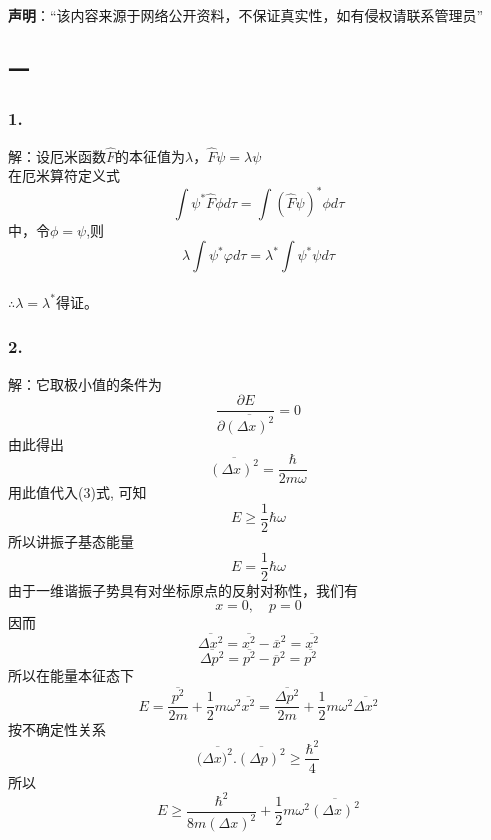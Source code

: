 
\textbf{声明}：“该内容来源于网络公开资料，不保证真实性，如有侵权请联系管理员”

\subsection{一}
\subsubsection{1.}
解：设厄米函数$\hat{F}$的本征值为$\lambda$，$\hat{F}\psi = \lambda \psi$\\
在厄米算符定义式$$\int \psi^* \hat{F} \phi d\tau = \int (\hat{F} \psi)^* \phi d\tau~$$中，令$\phi=\psi$,则$$\lambda \int \psi^* \varphi d\tau = \lambda^* \int \psi^* \psi d\tau~$$\\
$\therefore \lambda=\lambda^*$得证。
\subsubsection{2.}
解：它取极小值的条件为
$$\frac{\partial E}{\partial \overline{(\Delta x)^2}} = 0~$$
由此得出
$$\overline{(\Delta x)^2} = \frac{\hbar}{2 m \omega}~$$
用此值代入(3)式, 可知
$$E \geq \frac{1}{2} \hbar \omega~$$
所以讲振子基态能量
$$E = \frac{1}{2} \hbar \omega~$$
由于一维谐振子势具有对坐标原点的反射对称性，我们有
$$ x = 0, \quad  p = 0~$$
因而
$$ \overline{\Delta x^2} =\overline{x^2} -\overline{x}^2 =\overline{x^2}~ $$
$$ \overline{\Delta p^2} =\overline{p^2} - \overline{p}^2 =\overline{p^2}~ $$
所以在能量本征态下
$$ E = \frac{\overline{p^2}}{2m} + \frac{1}{2} m \omega^2\overline{x^2}= \frac{\overline{\Delta p^2}}{2m} + \frac{1}{2} m \omega^2 \overline{\Delta x^2}~$$
按不确定性关系
$$ (\overline{\Delta x)^2}.\overline{(\Delta p)^2}\geq \frac{\hbar^2}{4}~$$
所以
$$ E \geq \frac{\hbar^2}{8m (\Delta x)^2} + \frac{1}{2} m \omega^2 \overline{(\Delta x)^2}~$$
